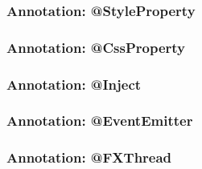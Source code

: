 \subsubsection{Annotation: @StyleProperty}
\subsubsection{Annotation: @CssProperty}
\subsubsection{Annotation: @Inject}
\subsubsection{Annotation: @EventEmitter}
\subsubsection{Annotation: @FXThread}
